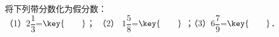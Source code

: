 将下列带分数化为假分数：\\（1）$2\dfrac{1}{3}$=$\key{\qquad}$；
（2） $1\dfrac{5}{8}$=$\key{\qquad}$ ；（3）$6\dfrac{7}{9}$=$\key{\qquad}$．
